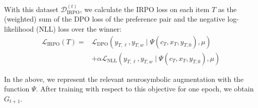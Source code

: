 With this dataset $\mathcal{D}_{\text{IRPO}}^{(t)}$, we calculate the IRPO loss on each item $T$ as the (weighted) sum of the DPO loss of the preference pair and the negative log-likelihood (NLL) loss over the winner:
\begin{align*}
\mathcal{L}_{\text{IRPO}}(T) =& \mathcal{L}_{\text{DPO}}(y_{T,\ell},y_{T,w} \mid \Psi(c_T,x_T,y_{T,0}),\mu) \\&+ \alpha\mathcal{L}_{\text{NLL}}(y_{T,\ell},y_{T,w} \mid \Psi(c_T,x_T,y_{T,0}),\mu)
\end{align*}

In the above, we represent the relevant neurosymbolic augmentation with the function $\Psi$. After training with respect to this objective for one epoch, we obtain $G_{t+1}$. 
